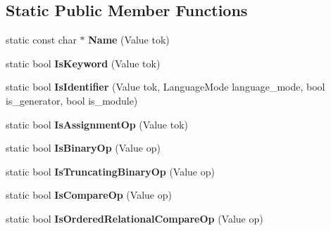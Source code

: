 \subsection*{Static Public Member Functions}
\begin{DoxyCompactItemize}
\item 
static const char $\ast$ {\bfseries Name} (Value tok)\hypertarget{classv8_1_1internal_1_1_token_a5a0e5f489eb832d50cbe60e95b5bffbb}{}\label{classv8_1_1internal_1_1_token_a5a0e5f489eb832d50cbe60e95b5bffbb}

\item 
static bool {\bfseries Is\+Keyword} (Value tok)\hypertarget{classv8_1_1internal_1_1_token_a55915790c51b39e7d6363d85a09f2ce9}{}\label{classv8_1_1internal_1_1_token_a55915790c51b39e7d6363d85a09f2ce9}

\item 
static bool {\bfseries Is\+Identifier} (Value tok, Language\+Mode language\+\_\+mode, bool is\+\_\+generator, bool is\+\_\+module)\hypertarget{classv8_1_1internal_1_1_token_a580ddc028b0dfe349ac40df1c7292712}{}\label{classv8_1_1internal_1_1_token_a580ddc028b0dfe349ac40df1c7292712}

\item 
static bool {\bfseries Is\+Assignment\+Op} (Value tok)\hypertarget{classv8_1_1internal_1_1_token_adf85802a53291707404da2235b768962}{}\label{classv8_1_1internal_1_1_token_adf85802a53291707404da2235b768962}

\item 
static bool {\bfseries Is\+Binary\+Op} (Value op)\hypertarget{classv8_1_1internal_1_1_token_a6c86b8c0b5c1a31d853a2edad571fb74}{}\label{classv8_1_1internal_1_1_token_a6c86b8c0b5c1a31d853a2edad571fb74}

\item 
static bool {\bfseries Is\+Truncating\+Binary\+Op} (Value op)\hypertarget{classv8_1_1internal_1_1_token_af78665f3ffed712b3047e0410db32e5a}{}\label{classv8_1_1internal_1_1_token_af78665f3ffed712b3047e0410db32e5a}

\item 
static bool {\bfseries Is\+Compare\+Op} (Value op)\hypertarget{classv8_1_1internal_1_1_token_a62cc331f6e96e759020975c50a9aef72}{}\label{classv8_1_1internal_1_1_token_a62cc331f6e96e759020975c50a9aef72}

\item 
static bool {\bfseries Is\+Ordered\+Relational\+Compare\+Op} (Value op)\hypertarget{classv8_1_1internal_1_1_token_a5374bee5a77c04a854e00e97bd205aa3}{}\label{classv8_1_1internal_1_1_token_a5374bee5a77c04a854e00e97bd205aa3}


\end{DoxyCompactItemize}
